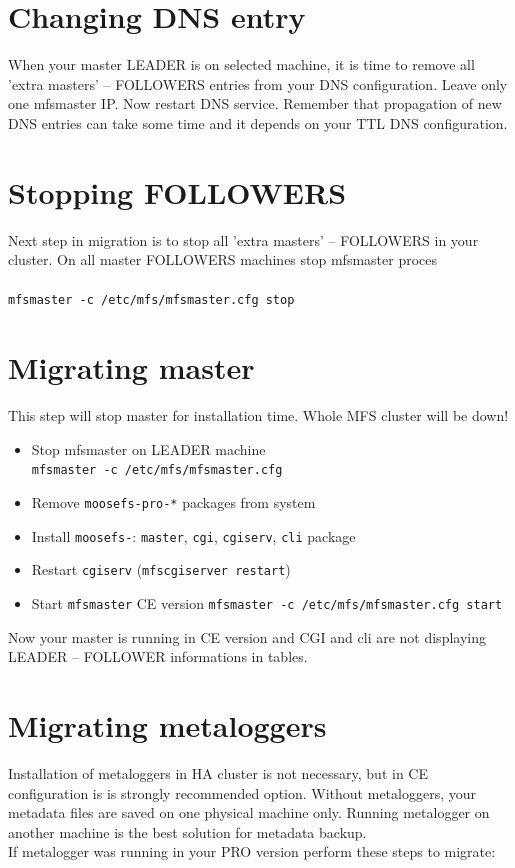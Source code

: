 \documentclass[a4paper,11pt,english]{report}
\def\code#1{\texttt{#1}}
\begin{document}
		\section{Changing DNS entry}
		When your master LEADER is on selected machine, it is time to remove all 'extra masters' -- FOLLOWERS  entries from your DNS configuration. Leave only one mfsmaster IP. Now restart DNS service. Remember that propagation of new DNS entries can take some time and it depends on your TTL DNS configuration.		
		
		\section{Stopping FOLLOWERS}
		
		Next step in migration is to stop all 'extra masters' -- FOLLOWERS in your cluster. On all master FOLLOWERS machines stop mfsmaster proces\\\\
		\code{mfsmaster -c /etc/mfs/mfsmaster.cfg stop}
		
		\section{Migrating master}
		This step will stop master for installation time. Whole MFS cluster will be down!\\
		\begin{itemize}
			\item Stop mfsmaster on LEADER machine\\ \code{mfsmaster -c /etc/mfs/mfsmaster.cfg}
			\item Remove \code{moosefs-pro-*} packages from system
			\item Install \code{moosefs-}: \code{master}, \code{cgi}, \code{cgiserv}, \code{cli} package
			\item Restart \code{cgiserv} (\code{mfscgiserver restart})
			\item Start \code{mfsmaster} CE version \code{mfsmaster -c /etc/mfs/mfsmaster.cfg start}
		\end{itemize}
		Now your master is running in CE version and CGI and cli are not displaying LEADER -- FOLLOWER informations in tables.
		
		\section{Migrating metaloggers}
		Installation of metaloggers in HA cluster is not necessary, but in CE configuration is is strongly recommended option. Without metaloggers, your metadata files are saved on one physical machine only. Running metalogger on another machine is the best solution for metadata backup.\\
		If metalogger was running in your PRO version perform these steps to migrate:
		
\end{document}
